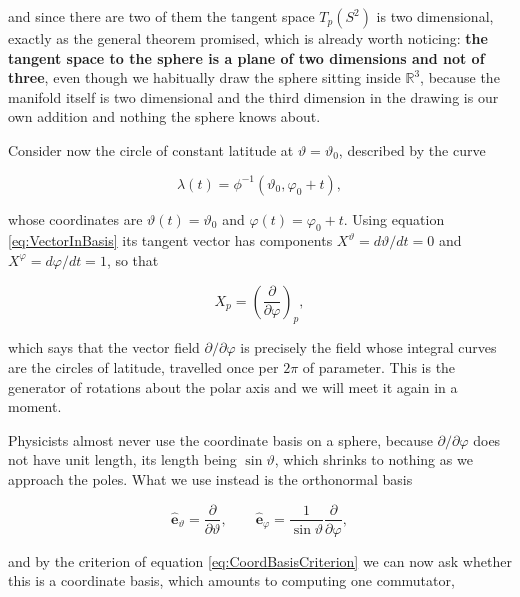         and since there are two of them the tangent space $T_p(S^2)$ is two dimensional, exactly as the general theorem promised, which is already worth noticing: \textbf{the tangent space to the sphere is a plane of two dimensions and not of three}, even though we habitually draw the sphere sitting inside $\mathbb{R}^3$, because the manifold itself is two dimensional and the third dimension in the drawing is our own addition and nothing the sphere knows about.

        Consider now the circle of constant latitude at $\vartheta = \vartheta_0$, described by the curve

        \begin{equation}
            \lambda(t) = \phi^{-1}\left(\vartheta_0, \varphi_0 + t\right),
        \end{equation}

        whose coordinates are $\vartheta(t) = \vartheta_0$ and $\varphi(t) = \varphi_0 + t$. Using equation \ref{eq:VectorInBasis} its tangent vector has components $X^{\vartheta} = d\vartheta/dt = 0$ and $X^{\varphi} = d\varphi/dt = 1$, so that

        \begin{equation}
            X_p = \left(\frac{\partial}{\partial \varphi}\right)_p,
        \end{equation}

        which says that the vector field $\partial/\partial\varphi$ is precisely the field whose integral curves are the circles of latitude, travelled once per $2\pi$ of parameter. This is the generator of rotations about the polar axis and we will meet it again in a moment.

        Physicists almost never use the coordinate basis on a sphere, because $\partial/\partial\varphi$ does not have unit length, its length being $\sin\vartheta$, which shrinks to nothing as we approach the poles. What we use instead is the orthonormal basis

        \begin{equation}
            \hat{\mathbf{e}}_{\vartheta} = \frac{\partial}{\partial \vartheta},\qquad \hat{\mathbf{e}}_{\varphi} = \frac{1}{\sin\vartheta}\frac{\partial}{\partial \varphi},
        \end{equation}

        and by the criterion of equation \ref{eq:CoordBasisCriterion} we can now ask whether this is a coordinate basis, which amounts to computing one commutator,

